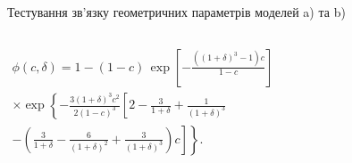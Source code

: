 \documentclass[10pt]{beamer}
\begin{document}
\begin{frame}{Тестування зв'язку геометричних параметрів моделей a) та b)}
\begin{columns}[T,onlytextwidth]
    \begin{equation*}\label{effectiveconcentration}
    \begin{split}
    \phi(c,\delta)= 1-
    (1 - c)\,\exp\left[{-\frac{((1+\delta)^3 -
    1)c}{1-c}}\right] \\
     \times  \exp\left\{
    - \frac{3(1 + \delta)^3
    c^2}{2(1 - c)^3} \left[2 - \frac{3}{1+\delta} +
    \frac{1}{(1+\delta)^3} \right. \right. \\
    - \left. \left. \left( \frac{3}{1+\delta} -
    \frac{6}{(1+\delta)^2} + \frac{3}{(1+\delta)^3}\right) c
    \right]\right\}. 
    \end{split}
    \end{equation*}
\end{columns}

\end{frame}
\end{document}
